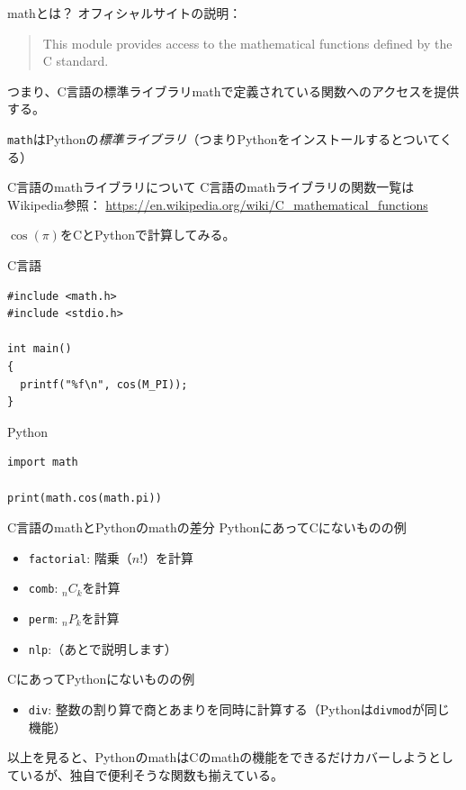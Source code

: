\documentclass[unicode,lualatex,aspectratio=169]{beamer}
\begin{document}
\begin{frame}[fragile]{mathとは？}
  オフィシャルサイトの説明：
  \begin{quote}
    This module provides access to the mathematical functions defined by the C standard.
  \end{quote}

  つまり、C言語の標準ライブラリmathで定義されている関数へのアクセスを提供する。

  {\tt math}はPythonの\emph{標準ライブラリ}（つまりPythonをインストールするとついてくる）
\end{frame}
\begin{frame}[fragile]{C言語のmathライブラリについて}
  C言語のmathライブラリの関数一覧はWikipedia参照：\newline
  {\tiny \url{https://en.wikipedia.org/wiki/C\_mathematical\_functions}}

$\cos(\pi)$をCとPythonで計算してみる。
\begin{minipage}[t]{0.45 \textwidth}
\fontsize{6pt}{6pt}\selectfont    
\noindent  
C言語
\begin{verbatim}
#include <math.h>
#include <stdio.h>

int main()
{
  printf("%f\n", cos(M_PI));
}
\end{verbatim}
\end{minipage}
\begin{minipage}[t]{0.45 \textwidth}
\fontsize{6pt}{6pt}\selectfont    
\noindent  
Python
\begin{verbatim}
import math

print(math.cos(math.pi))
\end{verbatim}
\end{minipage}
\end{frame}
\begin{frame}[fragile]{C言語のmathとPythonのmathの差分}
\noindent
PythonにあってCにないものの例
\begin{itemize}
\item \verb|factorial|: 階乗（$n!$）を計算
\item \verb|comb|: ${}_nC_k$を計算
\item \verb|perm|: ${}_nP_k$を計算
\item \verb|nlp|:（あとで説明します）
\end{itemize}
CにあってPythonにないものの例
\begin{itemize}
\item \verb|div|: 整数の割り算で商とあまりを同時に計算する（Pythonは\verb|divmod|が同じ機能）
\end{itemize}
以上を見ると、PythonのmathはCのmathの機能をできるだけカバーしようとしているが、独自で便利そうな関数も揃えている。
\end{frame}
\end{document}
